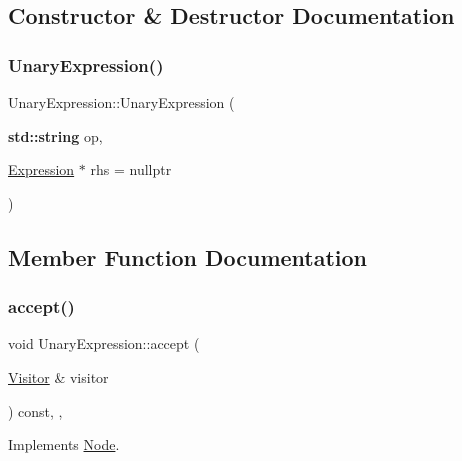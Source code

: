 \subsection{Constructor \& Destructor Documentation}
\mbox{\label{struct_unary_expression_a0a2158571198f271b43612707666e8fa}} 
\subsubsection{\texorpdfstring{Unary\+Expression()}{UnaryExpression()}}
{\footnotesize\ttfamily Unary\+Expression\+::\+Unary\+Expression (\begin{DoxyParamCaption}\item[{\textbf{ std\+::string}}]{op,  }\item[{\hyperlink{struct_expression}{Expression} $\ast$}]{rhs = {\ttfamily nullptr} }\end{DoxyParamCaption})\hspace{0.3cm}{\ttfamily [inline]}}



\subsection{Member Function Documentation}
\mbox{\label{struct_unary_expression_a88c89a0268ecfa5008b5afe7bc47913a}} 
\subsubsection{\texorpdfstring{accept()}{accept()}}
{\footnotesize\ttfamily void Unary\+Expression\+::accept (\begin{DoxyParamCaption}\item[{\hyperlink{struct_visitor}{Visitor} \&}]{visitor }\end{DoxyParamCaption}) const\hspace{0.3cm}{\ttfamily [inline]}, {\ttfamily [override]}, {\ttfamily [virtual]}}



Implements \hyperlink{struct_node_a10bd7af968140bbf5fa461298a969c71}{Node}.



